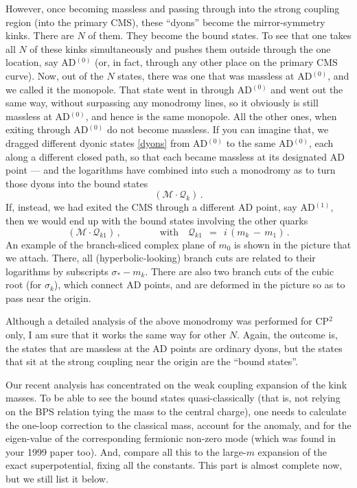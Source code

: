 \documentclass[epsfig,12pt]{article}
\def\beq{\begin{equation}}
\def\eeq{\end{equation}}
\def\beq{\begin{equation}}
\def\eeq{\end{equation}}
\newcommand{\mc}[1]{\mathcal{#1}}
\begin{document}
	However, once becoming massless and passing through into the strong coupling region (into the primary CMS), 
	these ``dyons'' become the mirror-symmetry kinks.
	There are $ N $ of them.
	They become the bound states.
	To see that one takes all $ N $ of these kinks simultaneously and pushes them outside through the one location, say
	AD$^{(0)}$ (or, in fact, through any other place on the primary CMS curve).
	Now, out of the $ N $ states, there was one that was massless at AD$^{(0)}$, and we called it the monopole.
	That state went in through AD$^{(0)}$ and went out the same way, without surpassing any monodromy lines,
	so it obviously is still massless at AD$^{(0)}$, and hence is the same monopole.
	All the other ones, when exiting through AD$^{(0)}$ do not become massless.
	If you can imagine that, we dragged different dyonic states \eqref{dyons} from AD$^{(0)}$ to the same AD$^{(0)}$, 
	each along a different closed path, so that each became massless at its designated AD point ---
	and the logarithms have combined into such a monodromy as to turn those dyons into the bound states
\beq
	( \mc{ M } \!\cdot\! \mc{Q}_k )\,.
\eeq
	If, instead, we had exited the CMS through a different AD point, say AD$^{(1)}$, then we would end up
	with the bound states involving the other quarks
\beq
	( \mc{ M } \!\cdot\! \mc{Q}_{k1} )\,,\qquad\qquad \text{with}\quad
	\mc{Q}_{k1} ~~=~~ i\, (m_k \,-\, m_1)\,.
\eeq
	An example of the branch-sliced complex plane of $ m_0 $ is shown in the picture that we attach.
	There, all (hyperbolic-looking) branch cuts are related to their logarithms by subscripts $ \sigma_* - m_k $.
	There are also two branch cuts of the cubic root (for $ \sigma_k $), which connect AD points, 
	and are deformed in the picture so as to pass near the origin.

	Although a detailed analysis of the above monodromy was performed for CP$^2$ only, I am 
	sure that it works the same way for other $ N $.
	Again, the outcome is, the states that are massless at the AD points are ordinary dyons, but the states
	that sit at the strong coupling near the origin are the ``bound states''. 

\vspace{0.8cm}
	Our recent analysis has concentrated on the weak coupling expansion of the kink masses.
	To be able to see the bound states quasi-classically (that is, not relying on the BPS relation tying
	the mass to the central charge), one needs to calculate the one-loop correction to the classical mass,
	account for the anomaly, and for the eigen-value of the corresponding fermionic non-zero mode (which was
	found in your 1999 paper too). And, compare all this to the large-$m$ expansion of the exact superpotential,
	fixing all the constants.
	This part is almost complete now, but we still list it below.
\end{document}
